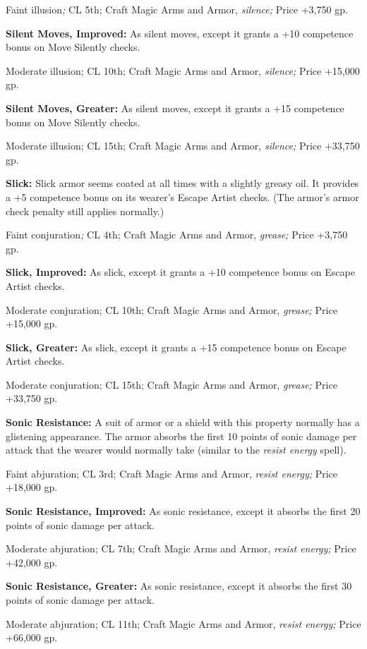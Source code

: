 \documentclass{article}
\begin{document}
Faint illusion\textit{; }CL 5th; Craft Magic Arms and Armor, \textit{silence; }Price 
+3,750 gp.

\textbf{Silent Moves, Improved:} As silent moves, except it grants a +10 competence 
bonus on Move Silently checks.

Moderate illusion; CL 10th; Craft Magic Arms and Armor, \textit{silence; }Price 
+15,000 gp.

\textbf{Silent Moves, Greater: }As silent moves, except it grants a +15 competence 
bonus on Move Silently checks.

Moderate illusion; CL 15th; Craft Magic Arms and Armor, \textit{silence; }Price 
+33,750 gp.

\textbf{Slick:} Slick armor seems coated at all times with a slightly greasy oil. 
It provides a +5 competence bonus on its wearer's Escape Artist checks. (The armor's 
armor check penalty still applies normally.)

Faint conjuration\textit{; }CL 4th; Craft Magic Arms and Armor, \textit{grease; 
}Price +3,750 gp.

\textbf{Slick, Improved: }As slick, except it grants a +10 competence bonus on 
Escape Artist checks.

Moderate conjuration; CL 10th; Craft Magic Arms and Armor, \textit{grease; }Price 
+15,000 gp.

\textbf{Slick, Greater:} As slick, except it grants a +15 competence bonus on Escape 
Artist checks.

Moderate conjuration; CL 15th; Craft Magic Arms and Armor, \textit{grease; }Price 
+33,750 gp.

\textbf{Sonic Resistance: }A suit of armor or a shield with this property normally 
has a glistening appearance. The armor absorbs the first 10 points of sonic damage 
per attack that the wearer would normally take (similar to the \textit{resist energy 
}spell).

Faint abjuration; CL 3rd; Craft Magic Arms and Armor, \textit{resist energy; }Price 
+18,000 gp.

\textbf{Sonic Resistance, Improved:} As sonic resistance, except it absorbs the 
first 20 points of sonic damage per attack.

Moderate abjuration; CL 7th; Craft Magic Arms and Armor, \textit{resist energy; 
}Price +42,000 gp.

\textbf{Sonic Resistance, Greater:} As sonic resistance, except it absorbs the 
first 30 points of sonic damage per attack.

Moderate abjuration; CL 11th; Craft Magic Arms and Armor, \textit{resist energy; 
}Price +66,000 gp.
\end{document}
